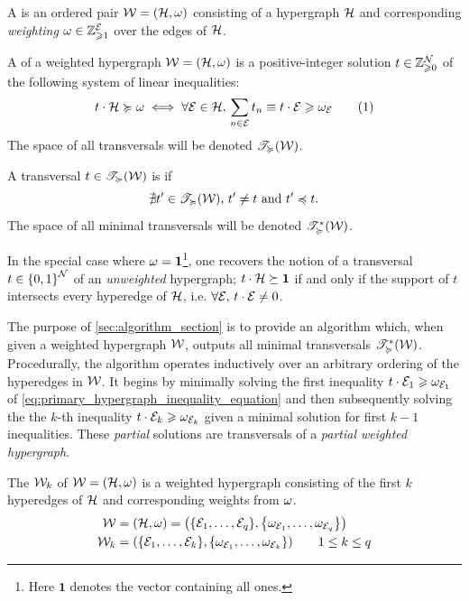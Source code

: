 \documentclass[aps, 10pt, english, twoside, twocolumn, pra, nofootinbib, tightenlines, longbibliography, superscriptaddress]{revtex4-1}
\begin{document}
    \begin{definition}
        A  is an ordered pair $\s W = \br{\s H, \w}$ consisting of a hypergraph $\mathcal{H}$ and corresponding \textit{weighting} $\omega \in {\mathbb{Z}}_{\geqslant 1}^{\mathcal{E}}$ over the edges of $\mathcal{H}$.
    \end{definition}

    \begin{definition}
        A  of a weighted hypergraph $\s W = \br{\s H, \w}$ is a positive-integer solution $t \in {\mathbb{Z}}_{\geqslant0}^{\mathcal{N}}$ of the following system of linear inequalities:
        \[ t \cdot \s H \succcurlyeq \w \iff \forall \s E \in \s H, \, \sum_{n \in \s E}t_{n} \defined t \cdot \s E \geqslant \w_{\s E} \eq \label{eq:primary_hypergraph_inequality_equation} \]
        The space of all transversals will be denoted $\mathscr{T}_{\succcurlyeq}\br{\s W}$.
    \end{definition}

    \begin{definition}
        A transversal $t \in \mathscr{T}_{\succcurlyeq}\br{\s W}$ is  if
        \[ \nexists t' \in \mathscr{T}_{\succcurlyeq}\br{\s W}, \, t'\neq t \text{ and } t' \preccurlyeq t. \]
        The space of all minimal transversals will be denoted $\mathscr{T}^{*}_{\succcurlyeq}\br{\s W}$.
    \end{definition}

    In the special case where $\omega = \mathbf{1}$\footnote{Here $\mathbf{1}$ denotes the vector containing all ones.}, one recovers the notion of a transversal $t \in \bc{0,1}^{\nodes}$ of an \textit{unweighted} hypergraph; $t \cdot \mathcal{H} \succeq \mathbf{1}$ if and only if the support of $t$ intersects every hyperedge of $\mathcal{H}$, i.e. $\forall \mathcal{E}, \, t \cdot \mathcal{E} \neq 0$.

    The purpose of \cref{sec:algorithm_section} is to provide an algorithm which, when given a weighted hypergraph $\mathcal{W}$, outputs all minimal transversals $\mathscr{T}^{*}_{\succcurlyeq}\br{\s W}$. Procedurally, the algorithm operates inductively over an arbitrary ordering of the hyperedges in $\mathcal{W}$. It begins by minimally solving the first inequality $t \cdot \mathcal{E}_1 \geqslant \omega_{\mathcal{E}_1}$ of \cref{eq:primary_hypergraph_inequality_equation} and then subsequently solving the the $k$-th inequality $t \cdot \mathcal{E}_{k} \geqslant \omega_{\mathcal{E}_{k}}$ given a minimal solution for first $k-1$ inequalities. These \textit{partial} solutions are transversals of a \textit{partial weighted hypergraph}.
    \begin{definition}
        The  $\mathcal{W}_{k}$ of $\s W = \br{\s H, \w}$ is a weighted hypergraph consisting of the first $k$ hyperedges of $\mathcal{H}$ and corresponding weights from $\omega$.
        \begin{align*}
            \s W &= \br{\s H, \w} = \br{\bc{\s E_1, \ldots, \s E_q}, \bc{\w_{\s E_1}, \ldots, \w_{\s E_q}}} \\
            \s W_{k} &= \br{\bc{\s E_1, \ldots, \s E_k}, \bc{\w_{\s E_1}, \ldots, \w_{\s E_k}}} \qquad 1 \leq k \leq q
        \end{align*}
    \end{definition}
\end{document}
